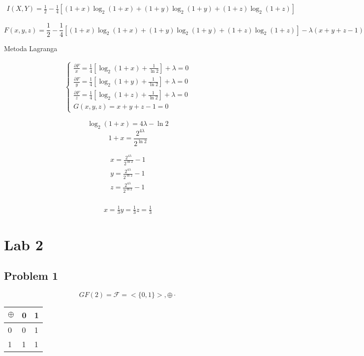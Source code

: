 \documentclass[12pt]{article}
\begin{document}
\begin{multline*}
    I(X,Y) = \frac{1}{2}- \frac{1}{4} [(1+x)\log_2(1+x)+(1+y)\log_2(1+y)+(1+z)\log_2(1+z)]
\end{multline*}

$$F(x,y,z) = \frac{1}{2}- \frac{1}{4} [(1+x)\log_2(1+x)+(1+y)\log_2(1+y)+(1+z)\log_2(1+z)] - \lambda (x+y+z-1)$$

Metoda Lagranga 

\begin{align*}
    \begin{cases}
        \frac{\partial F}{x} = \frac{1}{4}[\log_2(1+x) + \frac{1}{\ln2}] + \lambda = 0 \\
        \frac{\partial F}{y} = \frac{1}{4}[\log_2(1+y) + \frac{1}{\ln2}] + \lambda = 0 \\
        \frac{\partial F}{z} = \frac{1}{4}[\log_2(1+z) + \frac{1}{\ln2}] + \lambda = 0 \\
        G(x,y,z) = x+y+z - 1 = 0
    \end{cases}
\end{align*}

$$ \log_2(1+x) = 4\lambda - \ln 2 $$
$$ 1+x = \frac{2^{4\lambda}}{2^{\ln 2}} $$

\begin{align*}
    x = \frac{2^{4\lambda}}{2^{\ln 2}} - 1 \\
    y = \frac{2^{4\lambda}}{2^{\ln 2}} - 1 \\
    z = \frac{2^{4\lambda}}{2^{\ln 2}} - 1 \\
\end{align*}

\begin{align*}
    x= \frac{1}{3}
    y= \frac{1}{3}
    z= \frac{1}{3}
\end{align*}

\section*{Lab 2}

\subsection*{Problem 1}

$$GF(2) = \mathcal{F} = < \{0,1 \}>, \oplus \cdot $$

\begin{table}[h]
\begin{tabular}{l|ll}
$\oplus$  & 0 & 1 \\ \hline
0 & 0 & 1 \\
1 & 1 & 1
\end{tabular}
\end{table}
\end{document}
